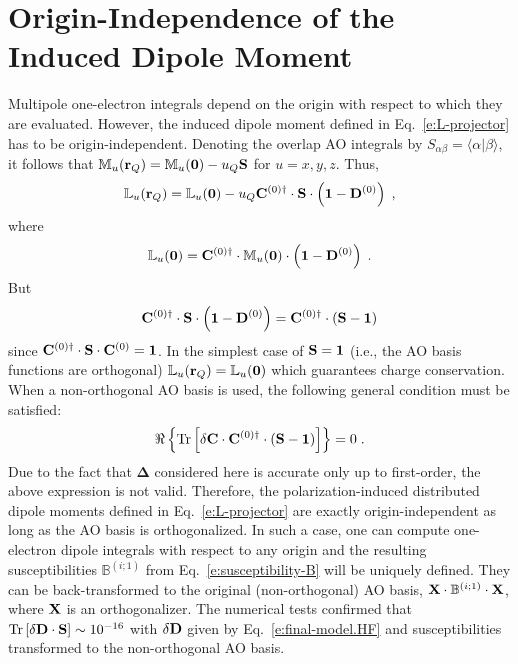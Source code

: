 \documentclass[aip,jcp,preprint,amsmath,amssymb,floatfix]{revtex4-1}
\newcommand{\braket}[2]{\ensuremath{\bigl\langle {#1} \bigl\lvert {#2} \bigr\rangle}}
\newcommand{\BM}[1]{\bm{#1}}
\DeclareMathOperator{\Tr}{Tr}
\begin{document}
%
\appendix

\section{\label{a:orig-dep} Origin-Independence of the Induced Dipole Moment}

Multipole one\hyp{}electron integrals depend on the origin with respect to which they are evaluated.
However, the induced dipole moment defined in Eq.~\eqref{e:L-projector} 
has to be origin\hyp{}independent. Denoting the overlap AO integrals 
by $S_{\alpha\beta} = \braket{\alpha}{\beta}$,
it follows that $\mathbb{M}_u({\bf r}_Q) = \mathbb{M}_u({\bf 0}) - u_Q {\bf S}$
for $u=x,y,z$. Thus,
%
\begin{equation}
 \mathbb{L}_u({\bf r}_Q) = \mathbb{L}_u({\bf 0})
                          - u_Q {\bf C}^{(0)\dagger} \cdot {\bf S} \cdot \left( {\bf 1} - {\bf D}^{(0)}\right) \;,
\end{equation}
%
where
%
\begin{equation}
 \mathbb{L}_u({\bf 0}) = {\bf C}^{(0)\dagger} \cdot \mathbb{M}_u({\bf 0}) \cdot \left( {\bf 1} - {\bf D}^{(0)}\right) \;.
\end{equation}
%
But
%
\begin{equation}
  {\bf C}^{(0)\dagger} \cdot {\bf S} \cdot \left( {\bf 1} - {\bf D}^{(0)}\right) 
= {\bf C}^{(0)\dagger} \cdot \left( {\bf S} - {\bf 1} \right)
\end{equation}
%
since ${\bf C}^{(0)\dagger} \cdot {\bf S} \cdot {\bf C}^{(0)} = {\bf 1}$. 
In the simplest case of ${\bf S} = {\bf 1}$ (i.e., the AO basis functions are orthogonal) 
$\mathbb{L}_u({\bf r}_Q) = \mathbb{L}_u({\bf 0})$ which guarantees charge conservation.
When a non\hyp{}orthogonal AO basis is used, 
the following general condition must be satisfied:
%
\begin{equation}
 \Re \left\{
  \Tr{
  \left[
  \delta {\bf C} \cdot {\bf C}^{(0)\dagger} \cdot \left( {\bf S} - {\bf 1} \right)  
 \right]}
 \right\} = 0 \;.
\end{equation}
%
Due to the fact that ${\BM \Delta}$ considered here is accurate only up to first\hyp{}order, 
the above expression is not valid. 
Therefore, the polarization\hyp{}induced distributed dipole moments 
defined in Eq.~\eqref{e:L-projector} are exactly origin\hyp{}independent
as long as the AO basis is orthogonalized.
In such a case, one can compute one\hyp{}electron dipole integrals with respect to any origin 
and the resulting susceptibilities $\mathbb{B}^{(i;1)}$ 
from Eq.~\eqref{e:susceptibility-B} will be uniquely defined. They can be back\hyp{}transformed
to the original (non\hyp{}orthogonal) AO basis, 
${\bf X} \cdot \mathbb{B}^{(i;1)} \cdot {\bf X}$, where $\bf X$ is an orthogonalizer.
The numerical tests confirmed that $\Tr\left[\delta{\bf D}\cdot{\bf S}\right] \sim 10^{-16}$
with $\delta{\bf D}$ given by Eq.~\eqref{e:final-model.HF} and susceptibilities transformed
to the non\hyp{}orthogonal AO basis.
\end{document}
